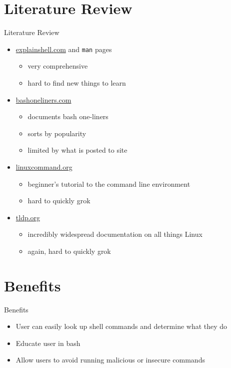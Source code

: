 \documentclass[xcolor=dvipsnames]{beamer}
\begin{document}
\section{Literature Review}\label{lit-review}
\begin{frame}{Literature Review}

\begin{itemize}
\itemsep1pt\parskip0pt
\item
  \href{http://explainshell.com/}{explainshell.com} and \texttt{man}
  pages

  \begin{itemize}
  \itemsep1pt\parskip0pt
  \item
    very comprehensive
  \item
    hard to find new things to learn
  \end{itemize}
\item
  \href{http://www.bashoneliners.com/}{bashoneliners.com}

  \begin{itemize}
  \itemsep1pt\parskip0pt
  \item
    documents bash one-liners
  \item
    sorts by popularity
  \item
    limited by what is posted to site
  \end{itemize}
\item
  \href{http://linuxcommand.org/}{linuxcommand.org}

  \begin{itemize}
  \itemsep1pt\parskip0pt
  \item
    beginner's tutorial to the command line environment
  \item
    hard to quickly grok
  \end{itemize}
\item
  \href{http://www.tldp.org/}{tldp.org}

  \begin{itemize}
  \itemsep1pt\parskip0pt
  \item
    incredibly widespread documentation on all things Linux
  \item
    again, hard to quickly grok
  \end{itemize}
\end{itemize}

\end{frame}

\section{Benefits}\label{benefits}
\begin{frame}{Benefits}

\begin{itemize}
\itemsep1pt\parskip0pt
\item
  User can easily look up shell commands and determine what they do
\item
  Educate user in bash
\item
  Allow users to avoid running malicious or insecure commands
\end{itemize}

\end{frame}
\end{document}
